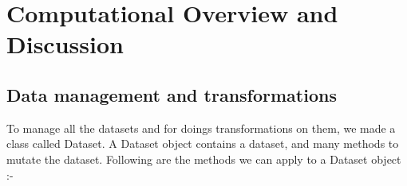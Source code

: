 \documentclass[a4paper, 11pt]{report}
\begin{document}
\newpage

\chapter{Computational Overview and Discussion}

\section{Data management and transformations}

To manage all the datasets and for doings transformations on them, we made a class called Dataset. A Dataset object contains a dataset, and many methods to mutate the dataset. Following are the methods we can apply to a Dataset object :- \\
\end{document}
